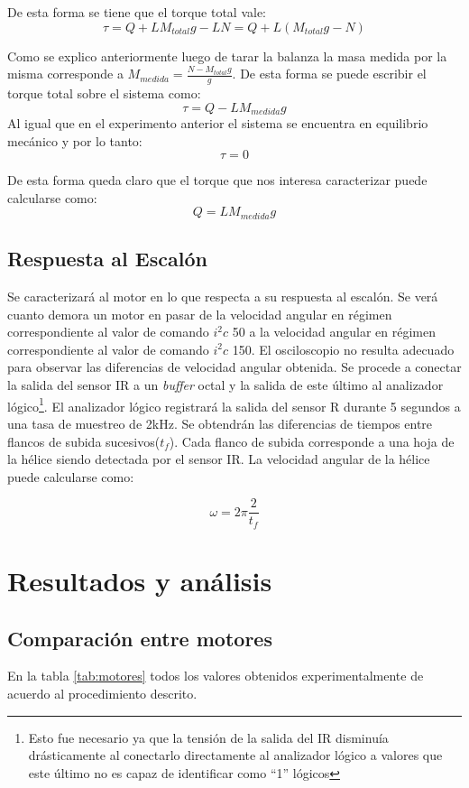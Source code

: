 \documentclass[main]{subfiles}
\begin{document}
De esta forma se tiene que el torque total vale:
$$
\tau=Q+LM_{total}g-LN=Q+L(M_{total}g-N)
$$

Como se explico anteriormente luego de tarar la balanza la masa medida por la misma corresponde a $M_{medida}=\frac{N-M_{total}g}{g} $. De esta forma se puede escribir el torque total sobre el sistema como:
$$
\tau=Q-LM_{medida}g
$$
Al igual que en el experimento anterior el sistema se encuentra en equilibrio mec\'anico y por lo tanto: 
$$
\tau=0
$$  

De esta forma queda claro que el torque que nos interesa caracterizar puede calcularse como:
$$
Q=LM_{medida}g
$$

\subsection{Respuesta al Escal\'on}
Se caracterizar\'a al motor en lo que respecta a su respuesta al escal\'on. Se ver\'a cuanto demora un motor en pasar de la velocidad angular en r\'egimen correspondiente al valor de comando $i^2c$ 50 a la velocidad angular en r\'egimen correspondiente al valor de comando $i^2c$ 150. El osciloscopio no resulta adecuado para observar las diferencias de velocidad angular obtenida. Se procede a conectar la salida del sensor IR a un \emph{buffer} octal y la salida de este \'ultimo al analizador l\'ogico\footnote{ Esto fue necesario ya que la tensi\'on de la salida del IR disminu\'ia dr\'asticamente al conectarlo directamente al analizador l\'ogico a valores que este \'ultimo no es capaz de identificar como ``1'' l\'ogicos}. El analizador l\'ogico registrar\'a la salida del sensor R durante 5 segundos a una tasa de muestreo de 2kHz. Se obtendr\'an las diferencias de tiempos entre flancos de subida sucesivos($t_f$). Cada flanco de subida corresponde a una hoja de la h\'elice siendo detectada por el sensor IR. La velocidad angular de la h\'elice puede calcularse como:

$$
\omega = 2 \pi \frac{2}{t_f}
$$ 
 
\section{Resultados y an\'alisis}

\subsection{Comparaci\'on entre motores}
\label{sec:motores} 

En la tabla \ref{tab:motores} todos los valores obtenidos experimentalmente de acuerdo al procedimiento descrito. 
\end{document}
